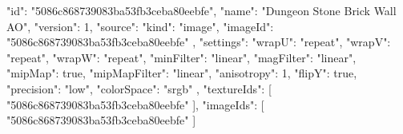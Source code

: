 {
  "id": "5086c868739083ba53fb3ceba80eebfe",
  "name": "Dungeon Stone Brick Wall AO",
  "version": 1,
  "source": {
    "kind": "image",
    "imageId": "5086c868739083ba53fb3ceba80eebfe"
  },
  "settings": {
    "wrapU": "repeat",
    "wrapV": "repeat",
    "wrapW": "repeat",
    "minFilter": "linear",
    "magFilter": "linear",
    "mipMap": true,
    "mipMapFilter": "linear",
    "anisotropy": 1,
    "flipY": true,
    "precision": "low",
    "colorSpace": "srgb"
  },
  "textureIds": [
    "5086c868739083ba53fb3ceba80eebfe"
  ],
  "imageIds": [
    "5086c868739083ba53fb3ceba80eebfe"
  ]
}
